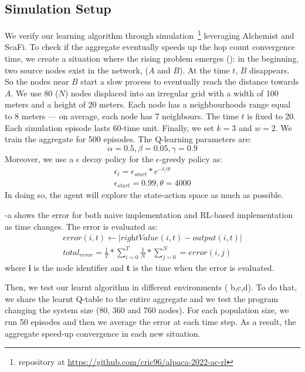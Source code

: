 \documentclass[conference]{IEEEtran}
\begin{document}
\subsection{Simulation Setup}
We verify our learning algorithm through simulation~\footnote{repository at \url{https://github.com/cric96/alpaca-2022-ac-rl}} leveraging Alchemist and ScaFi.
 To check if the aggregate eventually speeds up the hop count convergence time, we create a situation where the rising problem emerges ():
 in the beginning, two source nodes exist in the network, ($A$ and $B$).
 At the time $t$, $B$ disappears. So the nodes near $B$ start a slow process
 to eventually reach the distance towards $A$.
We use 80 ($N$) nodes displaced into an irregular grid with a width of 100 meters and a height of 20 meters. 
 Each node has a neighbourhoods range equal to 8 meters --- on average, each node has 7 neighbours. 
 The time $t$ is fixed to 20.
 Each simulation episode lasts 60-time unit. Finally, we set $k = 3$ and $w = 2$.
% 
We train the aggregate for 500 episodes.
 The Q-learning parameters are:
$$ 
\alpha = 0.5,
\beta = 0.05,
\gamma = 0.9
$$
Moreover, we use a $\epsilon$ decay policy for the $\epsilon$-greedy policy as:
\begin{equation*}
  \begin{array}{l}
    \epsilon_t = \epsilon_{start} * e^{-t/\theta}\\ 
    \epsilon_{start }= 0.99, \theta=4000
  \end{array}
\end{equation*}
In doing so, the agent will explore the state-action space as much as possible.

-a shows the error for both naive implementation and RL-based implementation as time changes.
The error is evaluated as:
\begin{equation*}
  \begin{array}{l}
    error(i, t) \leftarrow  | \textit{rightValue}(i,t) - \textit{output}(i,t) | \\
    total_{error} = \frac{1}{T} * \sum_{i = 0}^T \frac{1}{N} * \sum_{j = 0}^N = error(i, j)
  \end{array}
\end{equation*}
%
where \textbf{i} is the node identifier and \textbf{t} is the time when the error is evaluated.

Then, we test our learnt algorithm in different environments ( b,c,d). To do that, we share the learnt Q-table to the 
 entire aggregate and we test the program changing the system size (80, 360 and 760 nodes).
%
For each population size, we run 50 episodes and then we average the error at each time step. 
 As a result, the aggregate speed-up convergence in each new situation.
\end{document}
